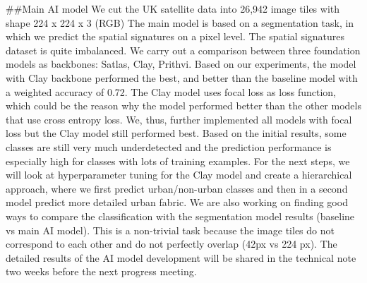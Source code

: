 \documentclass[
  letterpaper,
  DIV=11,
  numbers=noendperiod]{scrartcl}
\begin{document}
\#\#Main AI model We cut the UK satellite data into 26,942 image tiles
with shape 224 x 224 x 3 (RGB) The main model is based on a segmentation
task, in which we predict the spatial signatures on a pixel level. The
spatial signatures dataset is quite imbalanced. We carry out a
comparison between three foundation models as backbones: Satlas, Clay,
Prithvi. Based on our experiments, the model with Clay backbone
performed the best, and better than the baseline model with a weighted
accuracy of 0.72. The Clay model uses focal loss as loss function, which
could be the reason why the model performed better than the other models
that use cross entropy loss. We, thus, further implemented all models
with focal loss but the Clay model still performed best. Based on the
initial results, some classes are still very much underdetected and the
prediction performance is especially high for classes with lots of
training examples. For the next steps, we will look at hyperparameter
tuning for the Clay model and create a hierarchical approach, where we
first predict urban/non-urban classes and then in a second model predict
more detailed urban fabric. We are also working on finding good ways to
compare the classification with the segmentation model results (baseline
vs main AI model). This is a non-trivial task because the image tiles do
not correspond to each other and do not perfectly overlap (42px vs 224
px). The detailed results of the AI model development will be shared in
the technical note two weeks before the next progress meeting.
\end{document}
